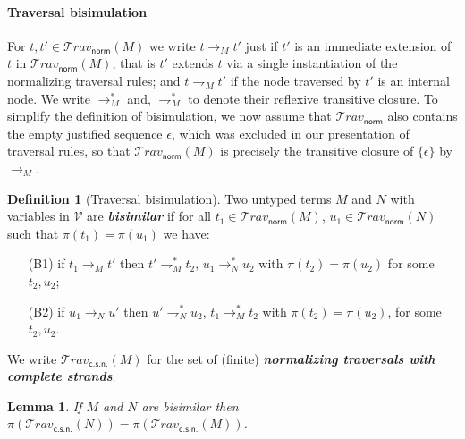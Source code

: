 \documentclass[xchauthor,chkrefs,GCNS,amsmath,amsthm,rotating,leaveRGB]{tcsg}
\renewcommand{\index}[1]{}
\theoremstyle{plain}
\newtheorem{lemma}[theorem]{Lemma}
\theoremstyle{definition}
\newtheorem{definition}{Definition}[section]
\def\internalextension{\rightharpoondown}
\newcommand\travset{\mathcal{T}\!rav}
\newcommand{\normalizing}{\mathsf{norm}}
\newcommand{\travsetnorm}{\travset_{\normalizing}}
\newcommand{\travsetscn}{\travset_{\mathsf{c.s.n.}}}
\def\coresymbol{\pi}
\newcommand{\core}[1]{\coresymbol(#1)}
\begin{document}
\paragraph*{Traversal bisimulation}
For $t, t' \in \travsetnorm (M)$ we write $t \rightarrow _{M} t'$ just if
$t'$ is an immediate extension of $t$ in $\travsetnorm (M)$, that is $t'$
extends $t$ via a single instantiation of the normalizing traversal rules;
and $t \internalextension _{M} t'$ if the node traversed by $t'$ is an
internal node. We write $\rightarrow _{M}^{*}$ and, $\internalextension
_{M}^{*}$ to denote their reflexive transitive closure. To simplify the
definition of bisimulation, we now assume that $\travsetnorm $ also contains
the empty justified sequence $\epsilon $, which was excluded in our
presentation of traversal rules, so that $\travsetnorm (M)$ is precisely the
transitive closure of $\{ \epsilon \}$ by $\rightarrow _{M}$.

\begin{definition}[Traversal bisimulation]\label{def:bisimilar_terms}
Two untyped terms $M$ and $N$ with variables in $\mathcal{V}$ are
\textbf{\emph{bisimilar}}\index{bisimilar} if for all $t_{1} \in \travsetnorm
(M)$, $u_{1} \in \travsetnorm (N)$ such that $\core{t_{1}} = \core{u_{1}}$ we
have:
%
\begin{itemize}[(B2)]
\item[(B1)] if $t_{1} \rightarrow _{M} t'$ then $t' \internalextension
    _{M}^{*} t_{2}$, $u_{1} \rightarrow ^{*}_{N} u_{2}$ with $\core{t_{2}}
    = \core{u_{2}}$ for some $t_{2}, u_{2}$;
\item[(B2)] if $u_{1} \rightarrow _{N} u'$ then $u' \internalextension
    _{N}^{*} u_{2}$, $t_{1} \rightarrow ^{*}_{M} t_{2}$ with $\core{t_{2}}
    = \core{u_{2}}$,
       for some $t_{2},u_{2}$.
\end{itemize}
\end{definition}

We write $\travsetscn (M)$ for the set of (finite) \textbf{\emph{normalizing
traversals with complete strands}}\index{normalizing traversals with complete
strands}.

\begin{lemma}\label{lem:bisimulation_isomorphism}
If $M$ and $N$ are bisimilar then $\coresymbol (\travsetscn (N)) =
\coresymbol (\travsetscn (M))$.
\end{lemma}
\end{document}
